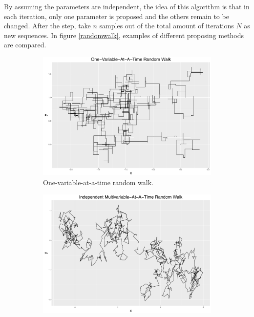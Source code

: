 By assuming the parameters are independent, the idea of this algorithm is that in each iteration, only one parameter is proposed and the others remain to be changed. After the step, take $n$ samples out of the total amount of iterations $N$ as new sequences. In figure \ref{randomwalk}, examples of different proposing methods are compared. 
\begin{figure}[h]
\centering
 \begin{subfigure}[b]{0.32\textwidth}
     \includegraphics[width=\textwidth]{Chapters/05MCMCOU/plots/ggoneRW.pdf}
     \caption{\footnotesize One-variable-at-a-time random walk.}\label{MCMConevariableRW}
\end{subfigure}
\begin{subfigure}[b]{0.32\textwidth}
     \includegraphics[width=\textwidth]{Chapters/05MCMCOU/plots/ggindRW.pdf}

\end{subfigure}
\end{figure}
